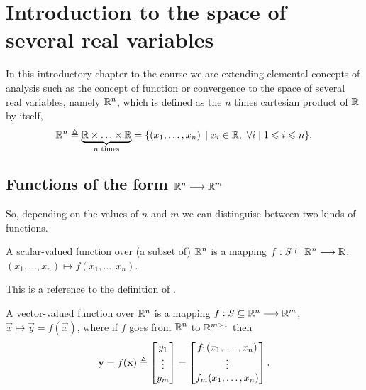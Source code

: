 \chapter[Introduction to the space of several real variables]{Introduction to the space of \\ several real variables}
\thispagestyle{noheaders}

In this introductory chapter to the course we are extending elemental concepts of analysis such as the concept of function or 
convergence to the space of several real variables, namely $\Rtn$, which is defined as the $n$ times cartesian product of $\R$ 
by itself,
\begin{equation}
\Rtn\bydef\underbrace{\R\times\ldots\times\R}_{n\textrm{ times}} = \{\left(x_1, \ldots, x_n\right)\st x_i\in\R,\ \forall i\st
1 \leq i \leq n\}.
\end{equation}


\section{Functions of the form $\Rtn\longrightarrow\R^m$}
So, depending on the values of $n$ and $m$ we can distinguise between two kinds of functions.

\begin{defn}\label{def:scalar-function}
	A scalar-valued function over (a subset of) $\Rtn$ is a mapping $\appl{f}{S\subseteq\Rtn}{\R}$, $\left(x_1, \ldots, x_n\right)
	\longmapsto f\left(x_1, \ldots, x_n\right)$.
\end{defn}

This is a reference to the definition of .

\begin{defn}
	A vector-valued function over $\Rtn$ is a mapping $\appl{f}{S\subseteq\Rtn}{\R^m}$, $\vec{x}\longmapsto\vec{y} = f(\vec{x})$, where
	if $f$ goes from $\Rtn$ to $\R^{m>1}$ then
	\begin{equation}
		\mathbf{y} = f(\mathbf{x})\triangleq\begin{bmatrix}y_1 \\ \vdots \\ y_m \end{bmatrix} = \begin{bmatrix}f_1(x_1, \ldots, x_n) \\
		\vdots \\ f_m(x_1, \ldots, x_n)\end{bmatrix}.
	\end{equation}
\end{defn}

